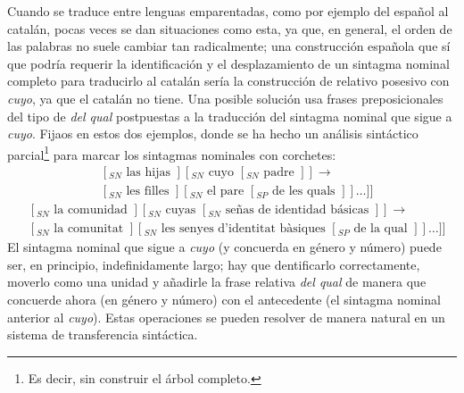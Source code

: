 Cuando se traduce entre lenguas emparentadas, como por ejemplo del español al catalán, pocas veces se dan situaciones como esta, ya que, en general, el orden de las palabras no suele cambiar tan radicalmente; una construcción española que sí que podría requerir la identificación y el desplazamiento de un sintagma nominal completo para traducirlo al catalán sería la construcción de relativo posesivo con \emph{cuyo}, ya que el catalán no tiene. Una posible solución usa frases preposicionales del tipo de \emph{del qual} postpuestas a la traducción del sintagma nominal que sigue a \emph{cuyo}. Fijaos en estos dos ejemplos, donde se ha hecho un análisis sintáctico parcial\footnote{Es decir, sin construir el árbol completo.} para marcar los sintagmas nominales con corchetes: $$\begin{array}{ll} &[_{SN} \mbox{ las hijas }] [_{SN} \mbox{ cuyo } [_{SN} \mbox{ padre } ] ] \rightarrow \\ &[_{SN} \mbox{ les filles } ] [_{SN} \mbox{ el pare } [_{SP} \mbox{ de les quals } ] ] \ldots ] ] \end{array} $$ $$ \begin{array}{ll} &[_{SN} \mbox{ la comunidad }] [_{SN} \mbox{ cuyas } [_{SN} \mbox{ se\~{n}as de identidad básicas } ] ] \rightarrow \\ &[_{SN} \mbox{ la comunitat }] [_{SN} \mbox{ les senyes d'identitat bàsiques } [_{SP} \mbox{ de la qual } ] ] \ldots ] ] \end{array} $$ El sintagma nominal que sigue a \emph{cuyo} (y concuerda en género y número) puede ser, en principio, indefinidamente largo; hay que dentificarlo correctamente, moverlo como una unidad y añadirle la frase relativa \emph{del qual} de manera que concuerde ahora (en género y número) con el antecedente (el sintagma nominal anterior al \emph{cuyo}). Estas operaciones se pueden resolver de manera natural en un sistema de transferencia sintáctica. 

